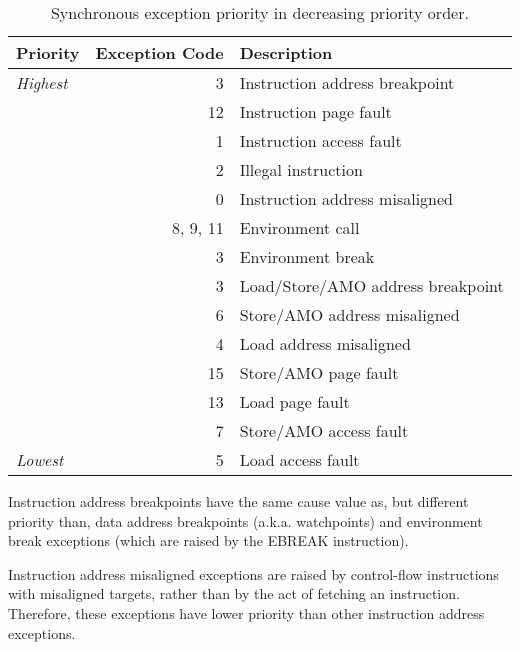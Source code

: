 \begin{table*}[htbp]
\begin{center}
\begin{tabular}{|l|r|l|}

  \hline
  Priority      & Exception Code & Description \\
  \hline
  {\em Highest} &          3 & Instruction address breakpoint \\ \hline
                &         12 & Instruction page fault \\ \hline
                &          1 & Instruction access fault \\ \hline
                &          2 & Illegal instruction \\
                &          0 & Instruction address misaligned \\
                &   8, 9, 11 & Environment call \\
                &          3 & Environment break \\
                &          3 & Load/Store/AMO address breakpoint \\ \hline
                &          6 & Store/AMO address misaligned \\
                &          4 & Load address misaligned \\ \hline
                &         15 & Store/AMO page fault \\
                &         13 & Load page fault \\ \hline
                &          7 & Store/AMO access fault \\
  {\em Lowest}  &          5 & Load access fault \\
  \hline

\end{tabular}
\end{center}
\caption{Synchronous exception priority in decreasing priority order.}
\label{exception-priority}
\end{table*}

\begin{commentary}
Instruction address breakpoints have the same cause value as, but
different priority than, data address breakpoints (a.k.a. watchpoints)
and environment break exceptions (which are raised by the EBREAK instruction).
\end{commentary}

\begin{commentary}
Instruction address misaligned exceptions are raised by control-flow
instructions with misaligned targets, rather than by the act of fetching an
instruction.  Therefore, these exceptions have lower priority than other
instruction address exceptions.
\end{commentary}

